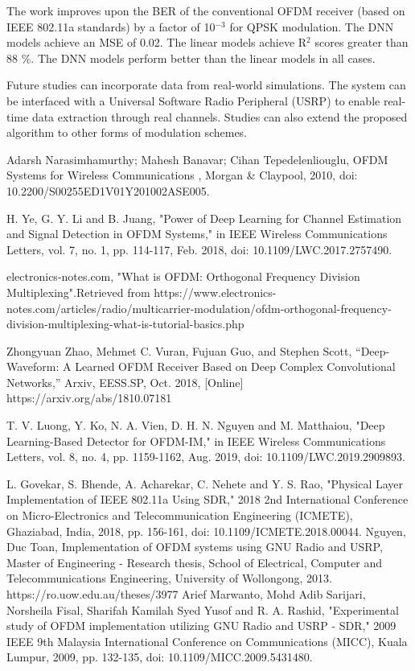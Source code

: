 \documentclass[conference]{IEEEtran}
\begin{document}
The work improves upon the BER of the conventional OFDM receiver (based on IEEE 802.11a standards) by a factor of 10$^{-3}$ for QPSK modulation. The DNN models achieve an MSE of 0.02. The linear models achieve R$^{2}$ scores greater than 88 \%. The DNN models perform better than the linear models in all cases.

Future studies can incorporate data from real-world simulations. The system can be interfaced with a Universal Software Radio Peripheral (USRP) to enable real-time data extraction through real channels. Studies can also extend the proposed algorithm to other forms of modulation schemes.





\begin{thebibliography}{00}

Adarsh Narasimhamurthy; Mahesh Banavar; Cihan Tepedelenliouglu, OFDM Systems for Wireless Communications , Morgan \& Claypool, 2010, doi: 10.2200/S00255ED1V01Y201002ASE005.

H. Ye, G. Y. Li and B. Juang, "Power of Deep Learning for Channel Estimation and Signal Detection in OFDM Systems," in IEEE Wireless Communications Letters, vol. 7, no. 1, pp. 114-117, Feb. 2018, doi: 10.1109/LWC.2017.2757490.

electronics-notes.com, "What is OFDM: Orthogonal Frequency Division Multiplexing".Retrieved from https://www.electronics-notes.com/articles/radio/multicarrier-modulation/ofdm-orthogonal-frequency-division-multiplexing-what-is-tutorial-basics.php

 Zhongyuan Zhao, Mehmet C. Vuran, Fujuan Guo, and Stephen Scott, “Deep-Waveform: A Learned OFDM Receiver Based on Deep Complex Convolutional Networks,” Arxiv, EESS.SP, Oct. 2018, [Online] https://arxiv.org/abs/1810.07181

T. V. Luong, Y. Ko, N. A. Vien, D. H. N. Nguyen and M. Matthaiou, "Deep Learning-Based Detector for OFDM-IM," in IEEE Wireless Communications Letters, vol. 8, no. 4, pp. 1159-1162, Aug. 2019, doi: 10.1109/LWC.2019.2909893.

L. Govekar, S. Bhende, A. Acharekar, C. Nehete and Y. S. Rao, "Physical Layer Implementation of IEEE 802.11a Using SDR," 2018 2nd International Conference on Micro-Electronics and Telecommunication Engineering (ICMETE), Ghaziabad, India, 2018, pp. 156-161, doi: 10.1109/ICMETE.2018.00044.
 Nguyen, Duc Toan, Implementation of OFDM systems using GNU Radio and USRP, Master of Engineering - Research thesis, School of Electrical, Computer and Telecommunications Engineering, University of Wollongong, 2013. https://ro.uow.edu.au/theses/3977
 Arief Marwanto, Mohd Adib Sarijari, Norsheila Fisal, Sharifah Kamilah Syed Yusof and R. A. Rashid, "Experimental study of OFDM implementation utilizing GNU Radio and USRP - SDR," 2009 IEEE 9th Malaysia International Conference on Communications (MICC), Kuala Lumpur, 2009, pp. 132-135, doi: 10.1109/MICC.2009.5431480.


\end{thebibliography}
\end{document}
